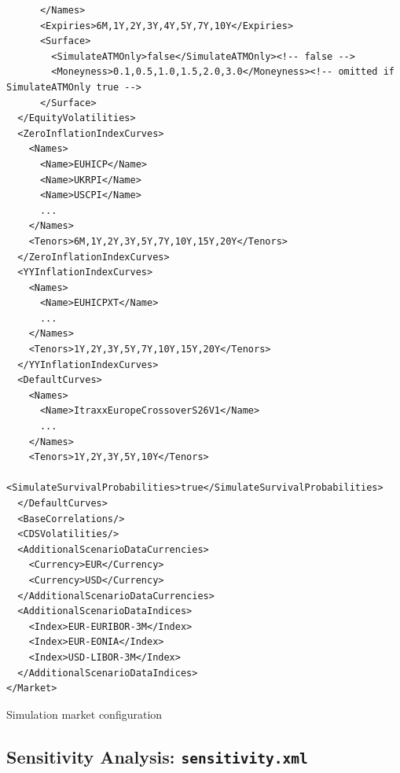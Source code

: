 \documentclass[12pt, a4paper]{article}
\newenvironment{longlisting}{\captionsetup{type=listing}}{}
\begin{document}
\begin{longlisting}
\begin{verbatim}
      </Names>
      <Expiries>6M,1Y,2Y,3Y,4Y,5Y,7Y,10Y</Expiries>
      <Surface>
        <SimulateATMOnly>false</SimulateATMOnly><!-- false -->
        <Moneyness>0.1,0.5,1.0,1.5,2.0,3.0</Moneyness><!-- omitted if SimulateATMOnly true -->
      </Surface>
  </EquityVolatilities>
  <ZeroInflationIndexCurves>
    <Names>
      <Name>EUHICP</Name>
      <Name>UKRPI</Name>
      <Name>USCPI</Name>
      ...
    </Names>
    <Tenors>6M,1Y,2Y,3Y,5Y,7Y,10Y,15Y,20Y</Tenors>
  </ZeroInflationIndexCurves>
  <YYInflationIndexCurves>
    <Names>
      <Name>EUHICPXT</Name>
      ...
    </Names>
    <Tenors>1Y,2Y,3Y,5Y,7Y,10Y,15Y,20Y</Tenors>
  </YYInflationIndexCurves>
  <DefaultCurves>
    <Names>
      <Name>ItraxxEuropeCrossoverS26V1</Name>
      ...
    </Names>
    <Tenors>1Y,2Y,3Y,5Y,10Y</Tenors>
    <SimulateSurvivalProbabilities>true</SimulateSurvivalProbabilities>
  </DefaultCurves>
  <BaseCorrelations/>
  <CDSVolatilities/>
  <AdditionalScenarioDataCurrencies>
    <Currency>EUR</Currency>
    <Currency>USD</Currency>
  </AdditionalScenarioDataCurrencies>
  <AdditionalScenarioDataIndices>
    <Index>EUR-EURIBOR-3M</Index>
    <Index>EUR-EONIA</Index>
    <Index>USD-LIBOR-3M</Index>
  </AdditionalScenarioDataIndices>
</Market>
\end{verbatim}
\caption{Simulation market configuration}
\label{lst:simulation_market_configuration}
\end{longlisting}


\subsection{Sensitivity Analysis: {\tt sensitivity.xml}}\label{sec:sensitivity}
\end{document}
